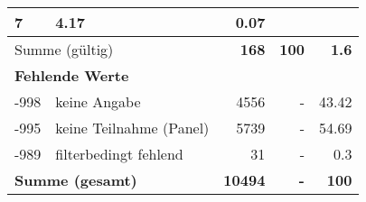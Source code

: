 \begin{longtable}{lXrrr}
       \num{7} &
       \num[round-mode=places,round-precision=2]{4.17} &
         \num[round-mode=places,round-precision=2]{0.07} \\
     \midrule
     \multicolumn{2}{l}{Summe (gültig)} &
       \textbf{\num{168}} &
     \textbf{\num{100}} &
       \textbf{\num[round-mode=places,round-precision=2]{1.6}} \\
     \multicolumn{5}{l}{\textbf{Fehlende Werte}}\\
       -998 &
       keine Angabe &
         \num{4556} &
        - &
         \num[round-mode=places,round-precision=2]{43.42} \\
       -995 &
       keine Teilnahme (Panel) &
         \num{5739} &
        - &
         \num[round-mode=places,round-precision=2]{54.69} \\
       -989 &
       filterbedingt fehlend &
         \num{31} &
        - &
         \num[round-mode=places,round-precision=2]{0.3} \\
     \midrule
     \multicolumn{2}{l}{\textbf{Summe (gesamt)}} &
          \textbf{\num{10494}} &
        \textbf{-} &
        \textbf{\num{100}} \\
     \bottomrule
     \end{longtable}
     
